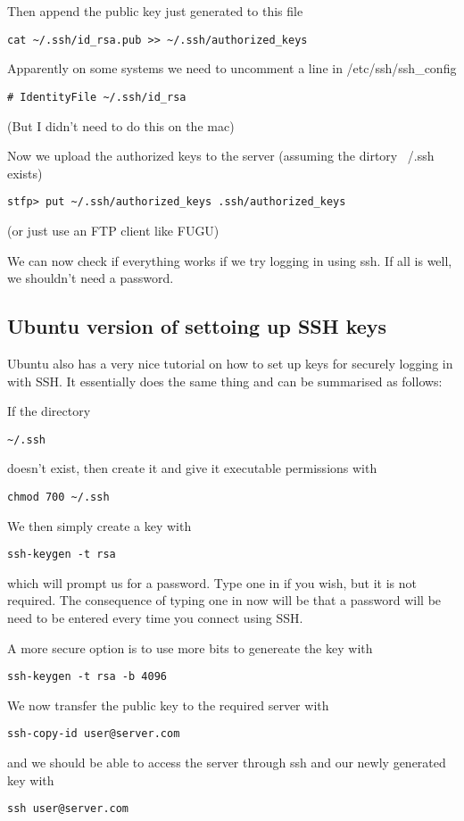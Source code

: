 \documentclass[a4paper, 10pt]{article}
\begin{document}
Then append the public key just generated to this file
\begin{verbatim}
cat ~/.ssh/id_rsa.pub >> ~/.ssh/authorized_keys
\end{verbatim}

Apparently on some systems we need to uncomment a line in /etc/ssh/ssh\_config
\begin{verbatim}
# IdentityFile ~/.ssh/id_rsa
\end{verbatim}
(But I didn't need to do this on the mac)

Now we upload the authorized keys to the server (assuming the dirtory ~/.ssh exists)
\begin{verbatim}
stfp> put ~/.ssh/authorized_keys .ssh/authorized_keys
\end{verbatim}
(or just use an FTP client like FUGU)

We can now check if everything works if we try logging in using
ssh. If all is well, we shouldn't need a password.



\subsection*{Ubuntu version of settoing up SSH keys}
\label{sec:ubuntu-vers-sett}

Ubuntu also has a very nice tutorial on how to set up keys for
securely logging in with SSH. It essentially does the same thing and
can be summarised as follows:

If the directory
\begin{verbatim}
~/.ssh
\end{verbatim}
doesn't exist, then create it and give it executable permissions with 
\begin{verbatim}
chmod 700 ~/.ssh
\end{verbatim}
We then simply create a key with 
\begin{verbatim}
ssh-keygen -t rsa
\end{verbatim}
which will prompt us for a password. Type one in if you wish, but it
is not required. The consequence of typing one in now will be that a
password will be need to be entered every time you connect using SSH.

A more secure option is to use more bits to genereate the key with 
\begin{verbatim}
ssh-keygen -t rsa -b 4096
\end{verbatim}

We now transfer the public key to the required server with 
\begin{verbatim}
ssh-copy-id user@server.com
\end{verbatim}
and we should be able to access the server through ssh and our newly
generated key with
\begin{verbatim}
ssh user@server.com
\end{verbatim}
\end{document}
